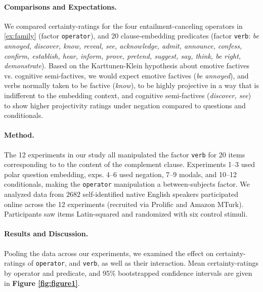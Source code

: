 \paragraph{Comparisons and Expectations.} \hspace{-1em}
	We compared certainty-ratings for the four entailment-canceling operators in \ref{ex:family} (factor \texttt{operator}), and 20 clause-embedding predicates (factor \texttt{verb}: {\em be annoyed, discover, know, reveal, see, acknowledge, admit, announce, confess, confirm, establish, hear, inform, prove, pretend, suggest, say, think, be right, demonstrate}).
	Based on the Karttunen-Klein hypothesis about emotive factives vs. cognitive semi-factives, we would expect emotive factives (\emph{be annoyed}), and verbs normally taken to be factive (\emph{know}), to be highly projective in a way that is indifferent to the embedding context, and cognitive semi-factives (\emph{discover, see}) to show higher projectivity ratings under negation compared to questions and conditionals.


\vspace{-\baselineskip}
\paragraph{Method.} \hspace{-1em}
	The 12 experiments in our study all manipulated the factor \texttt{verb} for 20 items corresponding to to the content of the complement clause. Experiments 1--3 used polar question embedding, exps. 4--6 used negation, 7--9 modals, and 10--12 conditionals, making the \texttt{operator} manipulation a between-subjects factor. We analyzed data from $2682$ self-identified native English speakers participated online across the 12 experiments (recruited via Prolific and Amazon MTurk). Participants saw items Latin-squared and randomized with six control stimuli.


\vspace{-\baselineskip}
\paragraph{Results and Discussion.} \hspace{-1em}
	Pooling the data across our experiments, we examined the effect on certainty-ratings of \texttt{operator}, and \texttt{verb}, as well as their interaction. Mean certainty-ratings by operator and predicate, and 95\% bootstrapped confidence intervals are given in  \textbf{Figure \ref{fig:figure1}}. 

